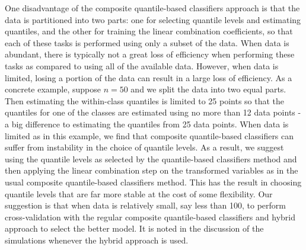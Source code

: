 One disadvantage of the composite quantile-based classifiers approach is that
the data is partitioned into two parts: one for selecting quantile levels and
estimating quantiles, and the other for training the linear combination
coefficients, so that each of these tasks is performed using only a subset of
the data.  When data is abundant, there is typically not a great loss of
efficiency when performing these tasks as compared to using all of the available
data.  However, when data is limited, losing a portion of the data can result in
a large loss of efficiency.  As a concrete example, suppose $n = 50$ and we
split the data into two equal parts.  Then estimating the within-class quantiles
is limited to 25 points so that the quantiles for one of the classes are
estimated using no more than 12 data points - a big difference to estimating the
quantiles from 25 data points.  When data is limited as in this example, we find
that composite quantile-based classifiers can suffer from instability in the
choice of quantile levels.  As a result, we suggest using the quantile levels as
selected by the quantile-based classifiers method and then applying the linear
combination step on the transformed variables as in the usual composite
quantile-based classifiers method.  This has the result in choosing quantile
levels that are far more stable at the cost of some flexibility.  Our suggestion
is that when data is relatively small, say less than 100, to perform
cross-validation with the regular composite quantile-based classifiers and
hybrid approach to select the better model.  It is noted in the discussion of
the simulations whenever the hybrid approach is used.




